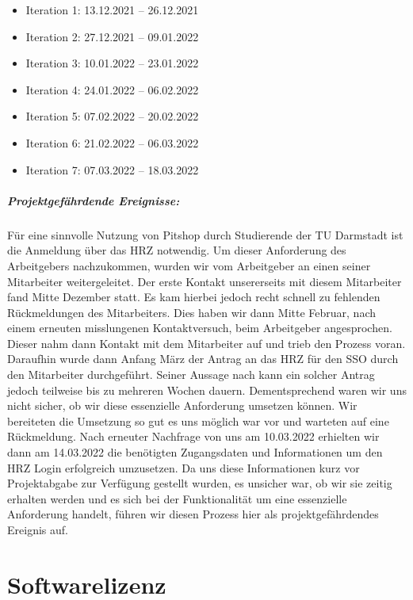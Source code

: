 \documentclass[
ngerman,
accentcolor=2d,
marginpar=false,
class=report,
fontsize=11pt,
ruledheaders=section,
]{tudapub}
\begin{document}
\begin{itemize}
    \item Iteration 1: 13.12.2021 -- 26.12.2021
    \item Iteration 2: 27.12.2021 -- 09.01.2022
    \item Iteration 3: 10.01.2022 -- 23.01.2022
    \item Iteration 4: 24.01.2022 -- 06.02.2022
    \item Iteration 5: 07.02.2022 -- 20.02.2022
    \item Iteration 6: 21.02.2022 -- 06.03.2022
    \item Iteration 7: 07.03.2022 -- 18.03.2022
\end{itemize}

\paragraph{Projektgefährdende Ereignisse:}
\noindent
Für eine sinnvolle Nutzung von Pitshop durch Studierende der TU Darmstadt ist die Anmeldung über das HRZ notwendig.
Um dieser Anforderung des Arbeitgebers nachzukommen, wurden wir vom Arbeitgeber an einen seiner Mitarbeiter weitergeleitet.
Der erste Kontakt unsererseits mit diesem Mitarbeiter fand Mitte Dezember statt. Es kam hierbei jedoch recht schnell zu fehlenden Rückmeldungen des Mitarbeiters. Dies haben wir dann Mitte Februar, nach einem erneuten misslungenen Kontaktversuch, beim Arbeitgeber angesprochen.
Dieser nahm dann Kontakt mit dem Mitarbeiter auf und trieb den Prozess voran.
Daraufhin wurde dann Anfang März der Antrag an das HRZ für den SSO durch den Mitarbeiter durchgeführt. Seiner Aussage nach kann ein solcher Antrag jedoch teilweise bis zu mehreren Wochen dauern. Dementsprechend waren wir uns nicht sicher, ob wir diese essenzielle Anforderung umsetzen können. Wir bereiteten die Umsetzung so gut es uns möglich war vor und warteten auf eine Rückmeldung. Nach erneuter Nachfrage von uns am 10.03.2022 erhielten wir dann am 14.03.2022 die benötigten Zugangsdaten und Informationen um den HRZ Login erfolgreich umzusetzen. Da uns diese Informationen kurz vor Projektabgabe zur Verfügung gestellt wurden, es unsicher war, ob wir sie zeitig erhalten werden und es sich bei der Funktionalität um eine essenzielle Anforderung handelt, führen wir diesen Prozess hier als projektgefährdendes Ereignis auf.


\chapter{Softwarelizenz}
\end{document}
